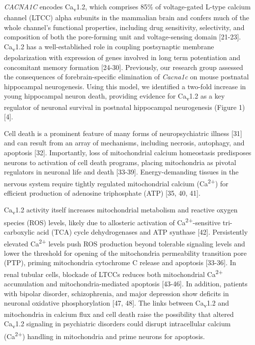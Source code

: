 \documentclass[]{article}
\begin{document}
\emph{CACNA1C} encodes Ca\textsubscript{v}1.2, which comprises 85\% of
voltage-gated L-type calcium channel (LTCC) alpha subunits in the
mammalian brain and confers much of the whole channel's functional
properties, including drug sensitivity, selectivity, and composition of
both the pore-forming unit and voltage-sensing domain {[}21-23{]}.
Ca\textsubscript{v}1.2 has a well-established role in coupling
postsynaptic membrane depolarization with expression of genes involved
in long term potentiation and concomitant memory formation {[}24-30{]}.
Previously, our research group assessed the consequences of
forebrain-specific elimination of \emph{Cacna1c} on mouse postnatal
hippocampal neurogenesis. 
Using this model, we identified a two-fold increase in young hippocampal 
neuron death, providing evidence for Ca\textsubscript{v}1.2 as a key regulator
 of neuronal survival in postnatal hippocampal neurogenesis (Figure 1) {[}4{]}.

Cell death is a prominent feature of many forms of neuropsychiatric
illness {[}31{]} and can result from an array of mechanisms, including
necrosis, autophagy, and apoptosis {[}32{]}. 
Importantly, loss of mitochondrial calcium homeostasis predisposes neurons to activation of
cell death programs, placing mitochondria as pivotal regulators in
neuronal life and death {[}33-39{]}. 
Energy-demanding tissues in the nervous system require 
tightly regulated mitochondrial calcium (Ca\textsuperscript{2+}) 
for efficient production of adenosine triphosphate (ATP) {[}35, 40, 41{]}.

Ca\textsubscript{v}1.2 activity itself increases mitochondrial
metabolism and reactive oxygen species (ROS) levels, likely due to
allosteric activation of Ca\textsuperscript{2+}-sensitive tri-carboxylic
acid (TCA) cycle dehydrogenases and ATP synthase {[}42{]}. 
Persistently elevated Ca\textsuperscript{2+} levels push ROS production beyond
tolerable signaling levels and lower the threshold for opening of the
mitochondria permeability transition pore (PTP), priming mitochondria
cytochrome C release and apoptosis {[}33-36{]}. 
In renal tubular cells, blockade of LTCCs reduces both mitochondrial Ca\textsuperscript{2+}
accumulation and mitochondria-mediated apoptosis {[}43-46{]}. 
In addition, patients with bipolar disorder, schizophrenia, and major
depression show deficits in neuronal oxidative phosphorylation {[}47, 48{]}. 
The links between Ca\textsubscript{v}1.2 and mitochondria in
calcium flux and cell death raise the possibility that altered
Ca\textsubscript{v}1.2 signaling in psychiatric disorders could disrupt
intracellular calcium (Ca\textsuperscript{2+}) handling in mitochondria
and prime neurons for apoptosis.
\end{document}
